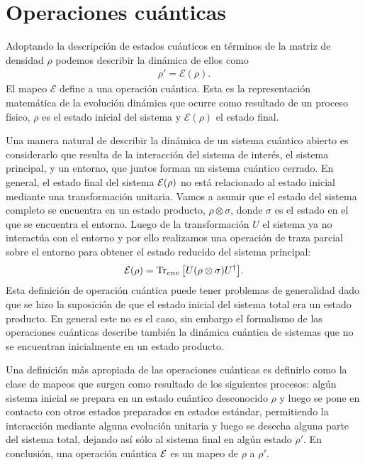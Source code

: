 \chapter{Operaciones cuánticas} %

Adoptando la descripción de estados cuánticos en términos de la matriz de 
densidad $\rho$ podemos describir la dinámica de ellos como
\begin{align*}
	\rho '=\mathcal{E} (\rho).
\end{align*}
El mapeo $\mathcal{E}$ define a una operación cuántica. Esta es la 
representación matemática de la evolución dinámica que ocurre como
resultado de un proceso físico, $\rho$ es el estado inicial del 
sistema y $\mathcal{E}(\rho)$ el estado final.

Una manera natural de describir la dinámica de un sistema cuántico
abierto es considerarlo que resulta de la interacción del sistema
de interés, el sistema principal, y un entorno, que juntos forman
un sistema cuántico cerrado. En general, el estado final 
del sistema $\mathcal{E} (\rho)$ no está relacionado al estado inicial
mediante una transformación unitaria. Vamos a asumir que
el estado del sistema completo se encuentra en un estado
producto, $\rho \otimes \sigma$, donde $\sigma$ es el 
estado en el que se encuentra el entorno. Luego de la
transformación $U$ el sistema ya no interactúa con el 
entorno y por ello realizamos una operación de traza parcial sobre 
el entorno para obtener el estado reducido del sistema principal:
\begin{align}
	\mathcal{E} (\rho) = \Tr _{env}\qty[U \qty(\rho \otimes \sigma)U^{\dagger}].
	\label{eq:PTraceE(rho)}
\end{align}
Esta definición de operación cuántica puede tener problemas
de generalidad dado que se hizo la suposición de que el 
estado inicial del sistema total era un estado producto. En 
general este no es el caso, sin embargo el formalismo de las 
operaciones cuánticas describe también la dinámica cuántica
de sistemas que no se encuentran inicialmente en un estado
producto.

Una definición más apropiada de las operaciones cuánticas es
definirlo como la clase de mapeos que surgen como resultado de
los siguientes procesos: algún sistema inicial se prepara en un
estado cuántico desconocido $\rho$ y luego se pone en contacto
con otros estados preparados en estados estándar, permitiendo 
la interacción mediante alguna evolución unitaria y luego
se desecha alguna parte del sistema total, dejando así 
sólo al sistema final en algún estado $\rho'$. En conclusión, 
una operación cuántica $\mathcal{E}$ es un mapeo de $\rho$ a $\rho'$.


